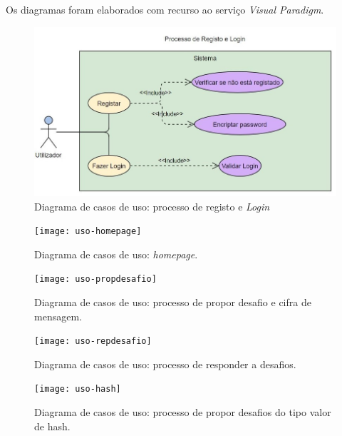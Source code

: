 Os diagramas foram elaborados com recurso ao serviço \textit{Visual Paradigm}.

\begin{figure}[!htbp]
	\centering
	\includegraphics[scale=0.8]{Imagens/Processo_Registo_Login.jpg}	\caption[Diagrama de casos de uso: processo de registo e \emph{Login}]{Diagrama de casos de uso: processo de registo e \emph{Login}}
	\label{fig::casos-uso-regis}
\end{figure}

\begin{figure}[!htbp]
	\centering
	\texttt{[image: uso-homepage]}
	\caption[Diagrama de casos de uso: \emph{homepage}]{Diagrama de casos de uso: \emph{homepage}.}
	\label{fig::casos-uso-homepage}
\end{figure}

\begin{figure}[!htbp]
	\centering
	\texttt{[image: uso-propdesafio]}
	\caption[Diagrama de casos de uso: processo de propor desafio e cifra de mensagem]{Diagrama de casos de uso: processo de propor desafio e cifra de mensagem.}
	\label{fig::casos-uso-propdesafio}
\end{figure}

\begin{figure}[!htbp]
	\centering
	\texttt{[image: uso-repdesafio]}
	\caption[Diagrama de casos de uso: processo de responder a desafios]{Diagrama de casos de uso: processo de responder a desafios.}
	\label{fig::casos-uso-repdesafio}
\end{figure}

\begin{figure}[!htbp]
	\centering
	\texttt{[image: uso-hash]}
	\caption[Diagrama de casos de uso: processo de propor desafios do tipo valor de hash]{Diagrama de casos de uso: processo de propor desafios do tipo valor de hash.}
	\label{fig::casos-uso-hash}
\end{figure}

